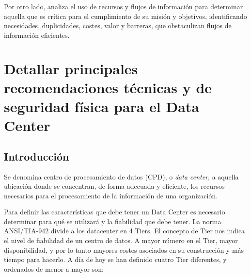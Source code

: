     Por otro lado, analiza el uso de recursos y flujos de información para determinar aquella que es crítica para el cumplimiento de su misión y objetivos, identificando necesidades, duplicidades, costes, valor y barreras, que obstaculizan flujos de información eficientes.
    
    
    \newpage
    
    \section{Detallar principales recomendaciones técnicas y de seguridad física para el Data Center}
    
    \subsection{Introducción}
    Se denomina centro de procesamiento de datos (CPD), o \textit{data center}, a aquella ubicación donde se concentran, de forma adecuada y eficiente, los recursos necesarios para el procesamiento de la información de una organización.
    
    Para definir las características que debe tener un Data Center es necesario determinar para qué se utilizará y la fiabilidad que debe tener. La norma  ANSI/TIA-942 divide a los datacenter en 4 Tiers. El concepto de Tier nos indica el nivel de fiabilidad de un centro de datos. A mayor número en el Tier, mayor disponibilidad, y por lo tanto mayores costes asociados en su construcción y más tiempo para hacerlo. A día de hoy se han definido cuatro Tier diferentes, y ordenados de menor a mayor son:
    

